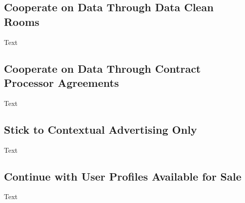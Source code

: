\subsection{Cooperate on Data Through Data Clean Rooms}

Text

\subsection{Cooperate on Data Through Contract Processor Agreements}

Text

\subsection{Stick to Contextual Advertising Only}

Text

\subsection{Continue with User Profiles Available for Sale}

Text


